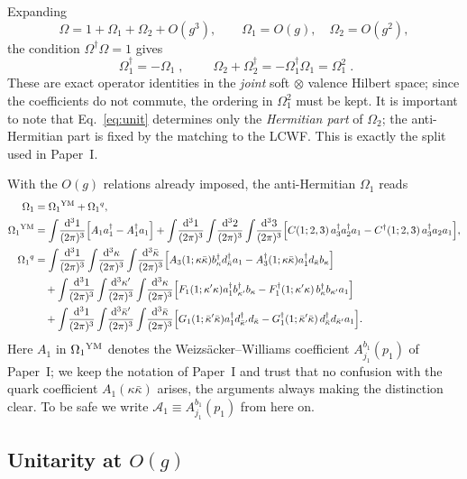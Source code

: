 \documentclass[11pt]{article}
\newcommand{\dd}{\mathrm{d}}
\newcommand{\ip}[1]{\int\!\frac{\dd^3 #1}{(2\pi)^3}}
\newcommand{\dg}{\dagger}
\newcommand{\OM}{\Omega}
\begin{document}
Expanding
\begin{equation}
\OM=1+\OM_1+\OM_2+O(g^3),\qquad \OM_1=O(g),\quad\OM_2=O(g^2),
\end{equation}
the condition $\OM^\dg\OM=1$ gives
\begin{equation}
\boxed{\;\OM_1^\dg=-\OM_1\;},\qquad
\boxed{\;\OM_2+\OM_2^\dg=-\OM_1^\dg\OM_1=\OM_1^2\;}.
\label{eq:unit}
\end{equation}
These are exact operator identities in the {\em joint} soft $\otimes$ valence Hilbert space; since
the coefficients do not commute, the ordering in $\OM_1^2$ must be kept. It is important to note
that Eq.~\eqref{eq:unit} determines only the {\em Hermitian part} of $\OM_2$; the anti-Hermitian
part is fixed by the matching to the LCWF. This is exactly the split used in Paper~I.

With the $O(g)$ relations already imposed, the anti-Hermitian $\OM_1$ reads
\begin{align}
\OM_1&=\OM_1{}^{\rm YM}+\OM_1{}^{q},\nonumber\\
\OM_1{}^{\rm YM}&=\ip{1}\Big[A_1a^\dg_1-A^\dg_1a_1\Big]
+\ip{1}\ip{2}\ip{3}\Big[C(1;2,3)\,a^\dg_3a^\dg_2a_1-C^\dg(1;2,3)\,a^\dg_3a_2a_1\Big],
\nonumber\\
\OM_1{}^{q}&=\ip{1}\ip{\kappa}\ip{\bar\kappa}\Big[A_3(1;\kappa\bar\kappa)b^\dg_\kappa d^\dg_{\bar\kappa}a_1
-A_3^\dg(1;\kappa\bar\kappa)a^\dg_1 d_{\bar\kappa}b_\kappa\Big]
\nonumber\\
&\quad+\ip{1}\ip{\kappa'}\ip{\kappa}\Big[F_1(1;\kappa'\kappa)a^\dg_1b^\dg_{\kappa'}b_\kappa
-F_1^\dg(1;\kappa'\kappa)\,b^\dg_\kappa b_{\kappa'}a_1\Big]
\nonumber\\
&\quad+\ip{1}\ip{\bar\kappa'}\ip{\bar\kappa}\Big[G_1(1;\bar\kappa'\bar\kappa)a^\dg_1d^\dg_{\bar\kappa'}d_{\bar\kappa}
-G_1^\dg(1;\bar\kappa'\bar\kappa)\,d^\dg_{\bar\kappa}d_{\bar\kappa'}a_1\Big].
\label{eq:Om1}
\end{align}
Here $A_1$ in $\OM_1{}^{\rm YM}$ denotes the Weizs\"acker--Williams coefficient $A^{b_1}_{j_1}(p_1)$
of Paper~I; we keep the notation of Paper~I and trust that no confusion with the quark coefficient
$A_1(\kappa\bar\kappa)$ arises, the arguments always making the distinction clear. To be safe we
write $\mathcal A_1\equiv A^{b_1}_{j_1}(p_1)$ from here on.

\subsection{Unitarity at $O(g)$}
\end{document}
